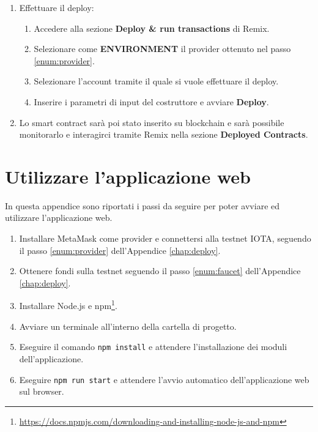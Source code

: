 \documentclass[12pt,a4paper,openright,twoside]{report}
\begin{document}
\begin{enumerate}
    \item Effettuare il deploy:
    \begin{enumerate}
        \item Accedere alla sezione \textbf{Deploy \& run transactions} di Remix.
        \item Selezionare come \textbf{ENVIRONMENT} il provider ottenuto nel passo \ref{enum:provider}.
        \item Selezionare l'account tramite il quale si vuole effettuare il deploy.
        \item Inserire i parametri di input del costruttore e avviare \textbf{Deploy}.
    \end{enumerate}
    \item Lo smart contract sarà poi stato inserito su blockchain e sarà possibile monitorarlo e interagirci tramite Remix nella sezione \textbf{Deployed Contracts}.
\end{enumerate}




\clearpage{\pagestyle{empty}\cleardoublepage}



\chapter{Utilizzare l'applicazione web}
In questa appendice sono riportati i passi da seguire per poter avviare ed utilizzare l'applicazione web.
\begin{enumerate}
    \item Installare MetaMask come provider e connettersi alla testnet IOTA, seguendo il passo \ref{enum:provider} dell'Appendice \ref{chap:deploy}.
    \item Ottenere fondi sulla testnet seguendo il passo \ref{enum:faucet} dell'Appendice \ref{chap:deploy}.
    \item Installare Node.js e npm\footnote{\url{https://docs.npmjs.com/downloading-and-installing-node-js-and-npm}}.
    \item Avviare un terminale all'interno della cartella di progetto.
    \item Eseguire il comando \texttt{npm install} e attendere l'installazione dei moduli dell'applicazione.
    \item Eseguire \texttt{npm run start} e attendere l'avvio automatico dell'applicazione web sul browser.
\end{enumerate}



\clearpage{\pagestyle{empty}\cleardoublepage}
\label{Bibliography}


\end{document}
